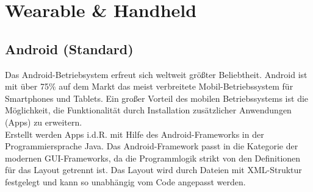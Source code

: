\newpage
\section{Wearable \& Handheld} \label{sec:hauptteil_android}

\subsection{Android (Standard)}
Das Android-Betriebsystem erfreut sich weltweit größter Beliebtheit. Android ist mit über 75\% auf dem Markt das meist verbreitete Mobil-Betriebssystem für Smartphones und Tablets. Ein großer Vorteil des mobilen Betriebssystems ist die Möglichkeit, die Funktionalität durch Installation zusätzlicher Anwendungen (Apps) zu erweitern.
\\[0.5cm]
Erstellt werden Apps i.d.R. mit Hilfe des Android-Frameworks in der Programmiersprache Java. Das Android-Framework passt in die Kategorie der modernen GUI-Frameworks, da die Programmlogik strikt von den Definitionen für das Layout getrennt ist. Das Layout wird durch Dateien mit XML-Struktur festgelegt und kann so unabhängig vom Code angepasst werden.

